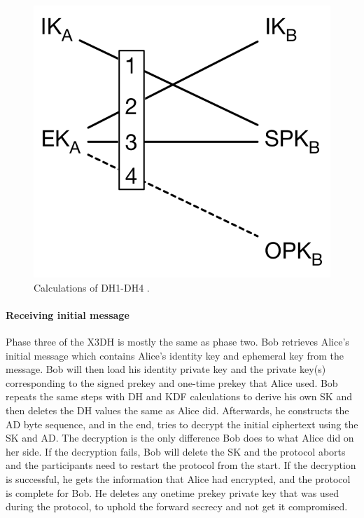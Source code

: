 \begin{figure}[H]
	\centering
	\includegraphics{figures/tripledh.png}
	\caption{Calculations of DH1-DH4 \cite{tripledh}.}
	\label{fig:tripledh}
\end{figure}


\paragraph{Receiving initial message}

Phase three of the X3DH is mostly the same as phase two. Bob retrieves
Alice’s initial message which contains Alice’s identity key and ephemeral
key from the message. Bob will then load his identity private key and the
private key(s) corresponding to the signed prekey and one-time prekey that
Alice used.
Bob repeats the same steps with DH and KDF calculations to derive his
own SK and then deletes the DH values the same as Alice did. Afterwards,
he constructs the AD byte sequence, and in the end, tries to decrypt the
initial ciphertext using the SK and AD. The decryption is the only difference
Bob does to what Alice did on her side. If the decryption fails, Bob will
delete the SK and the protocol aborts and the participants need to restart
the protocol from the start.
If the decryption is successful, he gets the information that Alice had
encrypted, and the protocol is complete for Bob. He deletes any onetime
prekey private key that was used during the protocol, to uphold the
forward secrecy and not get it compromised.

